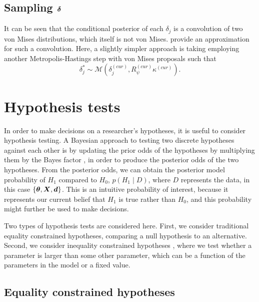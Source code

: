 \subsection{Sampling $\boldsymbol{\delta}$}

It can be seen that the conditional posterior of each \( \delta_j \) is a convolution of two von Mises distributions, which itself is not von Mises. \citet[p. 44]{mardia1999directional} provide an approximation for such a convolution. Here, a slightly simpler approach is taking employing another Metropolis-Hastings step with von Mises proposals such that
\begin{equation}
\delta_j^{*} \sim \mathcal{M} \left( \delta_j^{(cur)}, R_\psi^{(cur)} \kappa^{(cur)} \right).
\end{equation}


\section{Hypothesis tests}

\label{hypothesis}

In order to make decisions on a researcher's hypotheses, it is useful to consider hypothesis testing. A Bayesian approach to testing two discrete hypotheses against each other is by updating the prior odds of the hypotheses by multiplying them by the Bayes factor \citep{kass1995bayes, jeffreys1961theory}, in order to produce the posterior odds of the two hypotheses.
From the posterior odds, we can obtain the posterior model probability of \( H_1 \) compared to \( H_0 \), \( p(H_1 \mid D) \), where \( D \) represents the data, in this case \( \{ \boldsymbol{\theta}, \boldsymbol{X}, \boldsymbol{d} \} \). This is an intuitive probability of interest, because it represents our current belief that \( H_1 \) is true rather than \( H_0 \), and this probability might further be used to make decisions.


Two types of hypothesis tests are considered here. First, we consider traditional equality constrained hypotheses, comparing a null hypothesis to an alternative. Second, we consider inequality constrained hypotheses \citep{hoijtink2008bayesian, hoijtink2011informative}, where we test whether a parameter is larger than some other parameter, which can be a function of the parameters in the model or a fixed value.

\subsection{Equality constrained hypotheses}

